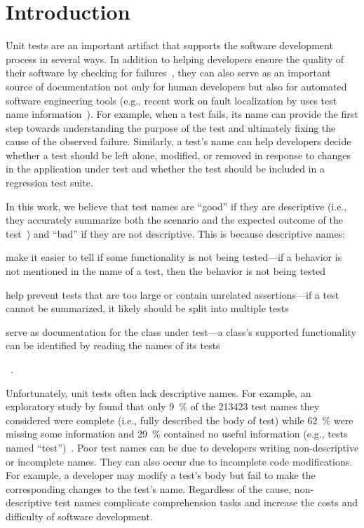 \section{Introduction}
\label{sec:introduction}

Unit tests are an important artifact that supports the software development process in several ways.
In addition to helping developers ensure the quality of their software by checking for failures~\cite{daka2014survey}, they can also serve as an important source of documentation not only for human developers but also for automated software engineering tools (e.g., recent work on fault localization by \citeauthor{li2019deepfl} uses test name information~\cite{li2019deepfl}).
%
For example, when a test fails, its name can provide the first step towards understanding the purpose of the test and ultimately fixing the cause of the observed failure.
%
Similarly, a test's name can help developers decide whether a test should be left alone, modified, or removed in response to changes in the application under test and whether the test should be included in a regression test suite.


In this work, we believe that test names are \enquote{good} if they are descriptive (i.e., they accurately summarize both the scenario and the expected outcome of the test~\cite{trenk14}) and \enquote{bad} if they are not descriptive.
%
This is because descriptive names:
\begin{enumerate*}
\item make it easier to tell if some functionality is not being tested---if a behavior is not mentioned in the name of a test, then the behavior is not being tested
\item help prevent tests that are too large or contain unrelated assertions---if a test cannot be summarized, it likely should be split into multiple tests
\item serve as documentation for the class under test---a class's supported functionality can be identified by reading the names of its tests
\end{enumerate*}~\cite{zhang2015automatically}.


Unfortunately, unit tests often lack descriptive names.
%
For example, an exploratory study by \citeauthor{zhang2015automatically} found that only \SI{9}{\percent} of the \num{213423} test names they considered were complete (i.e., fully described the body of test) while \SI{62}{\percent} were missing some information and \SI{29}{\percent} contained no useful information (e.g., tests named \enquote{test})~\cite{zhang2015automatically}.
%
Poor test names can be due to developers writing non-descriptive or incomplete names.
%
They can also occur due to incomplete code modifications.
%
For example, a developer may modify a test's body but fail to make the corresponding changes to the test's name.
%
Regardless of the cause, non-descriptive test names complicate comprehension tasks and increase the costs and difficulty of software development.


